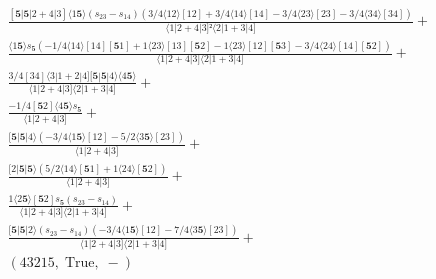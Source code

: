 \documentclass[varwidth, border=5pt]{standalone}
\begin{document}
\begin{my}
$\begin{gathered}
\scriptscriptstyle\frac{[𝟓|𝟓|2+4|3]⟨1𝟓⟩(s_{23}-s_{14})(3/4⟨12⟩[12]+3/4⟨14⟩[14]-3/4⟨23⟩[23]-3/4⟨34⟩[34])}{⟨1|2+4|3]²⟨2|1+3|4]} +\\
\scriptscriptstyle\frac{⟨1𝟓⟩s_{𝟓}(-1/4⟨14⟩[14][𝟓1]+1⟨23⟩[13][𝟓2]-1⟨23⟩[12][𝟓3]-3/4⟨24⟩[14][𝟓2])}{⟨1|2+4|3]⟨2|1+3|4]} +\\
\scriptscriptstyle\frac{3/4[34]⟨3|1+2|4][𝟓|𝟓|4⟩⟨4𝟓⟩}{⟨1|2+4|3]⟨2|1+3|4]} +\\
\scriptscriptstyle\frac{-1/4[𝟓2]⟨4𝟓⟩s_{𝟓}}{⟨1|2+4|3]} +\\
\scriptscriptstyle\frac{[𝟓|𝟓|4⟩(-3/4⟨1𝟓⟩[12]-5/2⟨3𝟓⟩[23])}{⟨1|2+4|3]} +\\
\scriptscriptstyle\frac{[2|𝟓|𝟓⟩(5/2⟨14⟩[𝟓1]+1⟨24⟩[𝟓2])}{⟨1|2+4|3]} +\\
\scriptscriptstyle\frac{1⟨2𝟓⟩[𝟓2]s_{𝟓}(s_{23}-s_{14})}{⟨1|2+4|3]⟨2|1+3|4]} +\\
\scriptscriptstyle\frac{[𝟓|𝟓|2⟩(s_{23}-s_{14})(-3/4⟨1𝟓⟩[12]-7/4⟨3𝟓⟩[23])}{⟨1|2+4|3]⟨2|1+3|4]} +\\
\scriptscriptstyle(43215,\;\text{True},\;-) \phantom{+}
\end{gathered}$
\end{my}
\end{document}
